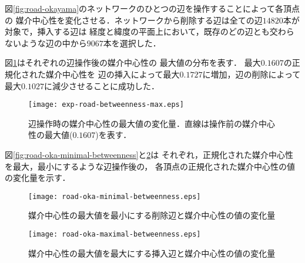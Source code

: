 図\ref{fig:road-okayama}のネットワークのひとつの辺を操作することによって各頂点の
媒介中心性を変化させる．ネットワークから削除する辺は全ての辺$14820$本が対象で，挿入する辺は
経度と緯度の平面上において，既存のどの辺とも交わらないような辺の中から$9067$本を選択した．

図\ref{fig:exp-road-betweenness-max}はそれぞれの辺操作後の媒介中心性の
最大値の分布を表す．
最大$0.1607$の正規化された媒介中心性を
辺の挿入によって最大$0.1727$に増加，辺の削除によって最大$0.1027$に減少させることに成功した．

\begin{figure}[tb]
  \centering
  \texttt{[image: exp-road-betweenness-max.eps]}
  \caption{辺操作時の媒介中心性の最大値の変化量．直線は操作前の媒介中心性の最大値($0.1607$)を表す．}
  \label{fig:exp-road-betweenness-max}
\end{figure}

図\ref{fig:road-oka-minimal-betweenness}と\ref{fig:road-oka-maximal-betweenness}は
それぞれ，正規化された媒介中心性を最大，最小にするような辺操作後の，
各頂点の正規化された媒介中心性の値の変化量を示す．

\begin{figure}[tb]
   \begin{minipage}{0.48\textwidth}
     \centering
     \texttt{[image: road-oka-minimal-betweenness.eps]}
     \caption{媒介中心性の最大値を最小にする削除辺と媒介中心性の値の変化量}
     \label{fig:road-oka-minimal-betweenness}
   \end{minipage}\hfill
   \begin{minipage}{0.48\textwidth}
     \centering
     \texttt{[image: road-oka-maximal-betweenness.eps]}
     \caption{媒介中心性の最大値を最大にする挿入辺と媒介中心性の値の変化量}
     \label{fig:road-oka-maximal-betweenness}
   \end{minipage}
\end{figure}

